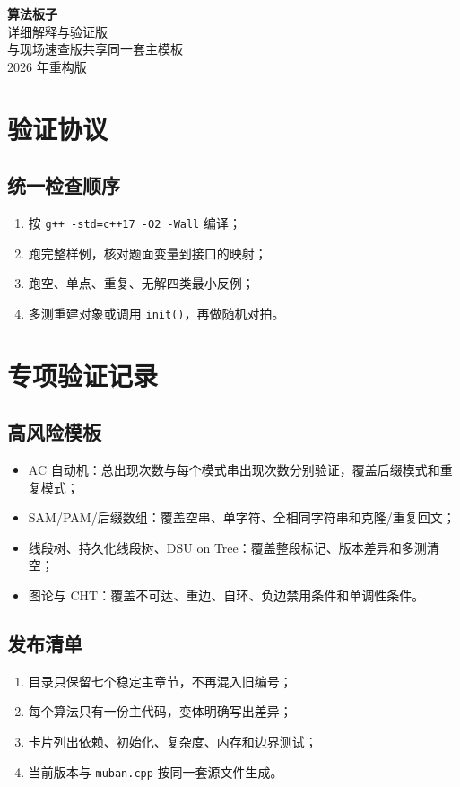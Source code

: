 
\renewcommand{\handbooktitle}{算法板子：详细解释与验证版}


\begin{titlepage}
\centering
\vspace*{5cm}
{\Huge\bfseries 算法板子}\\[1.2cm]
{\Large 详细解释与验证版}\\[1cm]
{\large 与现场速查版共享同一套主模板}\\
\vfill
{\large 2026 年重构版}
\end{titlepage}

\tableofcontents
\chapter*{验证协议}
\section*{统一检查顺序}
\begin{enumerate}
\item 按 \texttt{g++ -std=c++17 -O2 -Wall} 编译；
\item 跑完整样例，核对题面变量到接口的映射；
\item 跑空、单点、重复、无解四类最小反例；
\item 多测重建对象或调用 \texttt{init()}，再做随机对拍。
\end{enumerate}






\chapter{专项验证记录}
\section{高风险模板}
\begin{itemize}
\item AC 自动机：总出现次数与每个模式串出现次数分别验证，覆盖后缀模式和重复模式；
\item SAM/PAM/后缀数组：覆盖空串、单字符、全相同字符串和克隆/重复回文；
\item 线段树、持久化线段树、DSU on Tree：覆盖整段标记、版本差异和多测清空；
\item 图论与 CHT：覆盖不可达、重边、自环、负边禁用条件和单调性条件。
\end{itemize}
\section{发布清单}
\begin{enumerate}
\item 目录只保留七个稳定主章节，不再混入旧编号；
\item 每个算法只有一份主代码，变体明确写出差异；
\item 卡片列出依赖、初始化、复杂度、内存和边界测试；
\item 当前版本与 \texttt{muban.cpp} 按同一套源文件生成。
\end{enumerate}

